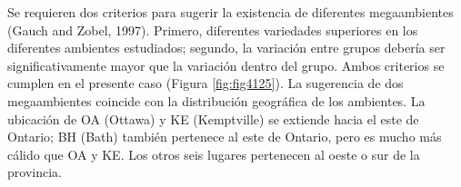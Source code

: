 Se requieren dos criterios para sugerir la existencia de diferentes megaambientes (Gauch and Zobel, 1997). Primero, diferentes variedades superiores en los diferentes ambientes estudiados; segundo, la variación entre grupos debería ser significativamente mayor que la variación dentro del grupo.  Ambos criterios se cumplen en el presente caso (Figura \ref{fig:fig4125}). La sugerencia de dos megaambientes coincide con la distribución geográfica de los ambientes. La ubicación de OA (Ottawa) y KE (Kemptville) se extiende hacia el este de Ontario; BH (Bath) también pertenece al este de Ontario, pero es mucho más cálido que OA y KE. Los otros seis lugares pertenecen al oeste o sur de la provincia.





